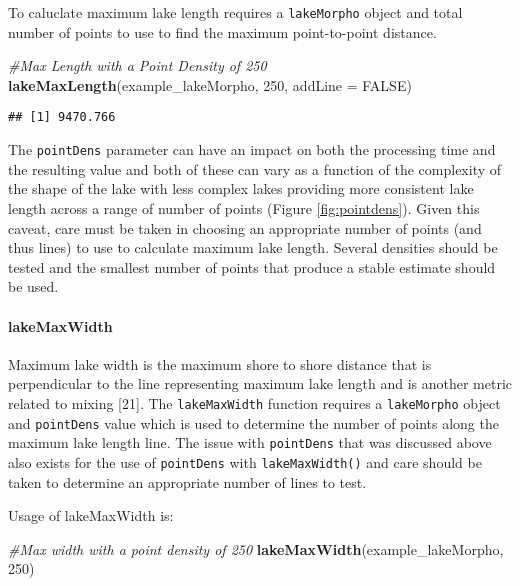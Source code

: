 \documentclass[11pt,]{article}
\newenvironment{Shaded}{\begin{snugshade}}{\end{snugshade}}
\newcommand{\KeywordTok}[1]{\textcolor[rgb]{0.13,0.29,0.53}{\textbf{{#1}}}}
\newcommand{\DataTypeTok}[1]{\textcolor[rgb]{0.13,0.29,0.53}{{#1}}}
\newcommand{\DecValTok}[1]{\textcolor[rgb]{0.00,0.00,0.81}{{#1}}}
\newcommand{\CommentTok}[1]{\textcolor[rgb]{0.56,0.35,0.01}{\textit{{#1}}}}
\newcommand{\OtherTok}[1]{\textcolor[rgb]{0.56,0.35,0.01}{{#1}}}
\newcommand{\NormalTok}[1]{{#1}}
\begin{document}
To caluclate maximum lake length requires a \texttt{lakeMorpho} object
and total number of points to use to find the maximum point-to-point
distance.

\begin{Shaded}
\begin{Highlighting}[]
\CommentTok{#Max Length with a Point Density of 250}
\KeywordTok{lakeMaxLength}\NormalTok{(example_lakeMorpho, }\DecValTok{250}\NormalTok{, }\DataTypeTok{addLine =} \OtherTok{FALSE}\NormalTok{)}
\end{Highlighting}
\end{Shaded}

\begin{verbatim}
## [1] 9470.766
\end{verbatim}

The \texttt{pointDens} parameter can have an impact on both the
processing time and the resulting value and both of these can vary as a
function of the complexity of the shape of the lake with less complex
lakes providing more consistent lake length across a range of number of
points (Figure \ref{fig:pointdens}). Given this caveat, care must be
taken in choosing an appropriate number of points (and thus lines) to
use to calculate maximum lake length. Several densities should be tested
and the smallest number of points that produce a stable estimate should
be used.

\paragraph{lakeMaxWidth}\label{lakemaxwidth}

Maximum lake width is the maximum shore to shore distance that is
perpendicular to the line representing maximum lake length and is
another metric related to mixing {[}21{]}. The \texttt{lakeMaxWidth}
function requires a \texttt{lakeMorpho} object and \texttt{pointDens}
value which is used to determine the number of points along the maximum
lake length line. The issue with \texttt{pointDens} that was discussed
above also exists for the use of \texttt{pointDens} with
\texttt{lakeMaxWidth()} and care should be taken to determine an
appropriate number of lines to test.

Usage of lakeMaxWidth is:

\begin{Shaded}
\begin{Highlighting}[]
\CommentTok{#Max width with a point density of 250}
\KeywordTok{lakeMaxWidth}\NormalTok{(example_lakeMorpho, }\DecValTok{250}\NormalTok{)}
\end{Highlighting}
\end{Shaded}
\end{document}
